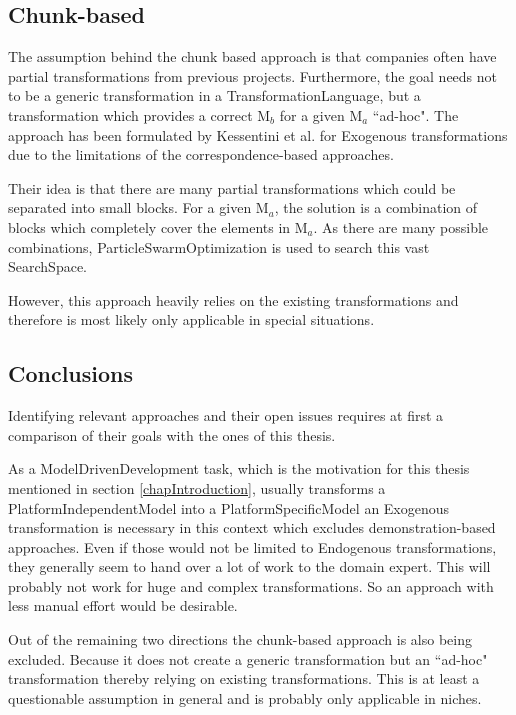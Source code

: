 \subsection{Chunk-based}

The assumption behind the chunk based approach is that companies often have partial transformations from previous projects. Furthermore, the goal needs not to be a generic transformation in a \gls{TransformationLanguage}, but a transformation which provides a correct M$_b$ for a given M$_a$ ``ad-hoc". The approach has been formulated by Kessentini et al. \cite{Kessentini2010} for \gls{Exogenous} transformations due to the limitations of the correspondence-based approaches.

Their idea is that there are many partial transformations which could be separated into small blocks. For a given M$_a$, the solution is a combination of blocks which completely cover the elements in M$_a$. As there are many possible combinations, \gls{ParticleSwarmOptimization} is used to search this vast \gls{SearchSpace}.

However, this approach heavily relies on the existing transformations and therefore is most likely only applicable in special situations.

\subsection{Conclusions}
\label{secRelatedWorkConclusions}

Identifying relevant approaches and their open issues requires at first a comparison of their goals with the ones of this thesis.

As a \gls{ModelDrivenDevelopment} task, which is the motivation for this thesis mentioned in section \ref{chapIntroduction}, usually transforms a \gls{PlatformIndependentModel} into a \gls{PlatformSpecificModel} an \gls{Exogenous} transformation is necessary in this context which excludes demonstration-based approaches. Even if those would not be limited to \gls{Endogenous} transformations, they generally seem to hand over a lot of work to the domain expert. This will probably not work for huge and complex transformations. So an approach with less manual effort would be desirable.

Out of the remaining two directions the chunk-based approach is also being excluded. Because it does not create a generic transformation but an ``ad-hoc" transformation thereby relying on existing transformations. This is at least a questionable assumption in general and is probably only applicable in niches.

